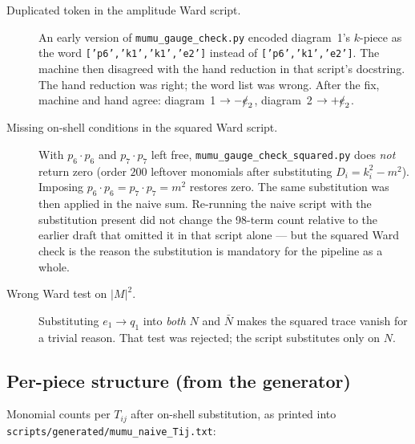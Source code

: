 \documentclass[11pt]{article}
\begin{document}
\begin{description}
  \item[Duplicated token in the amplitude Ward script.]
    An early version of \texttt{mumu\_gauge\_check.py} encoded diagram~1's
    $k$-piece as the word \texttt{['p6','k1','k1','e2']} instead of
    \texttt{['p6','k1','e2']}. The machine then disagreed with the hand
    reduction in that script's docstring. The hand reduction was right;
    the word list was wrong. After the fix, machine and hand agree:
    diagram~1 $\to-\slashed e_2$, diagram~2 $\to+\slashed e_2$.
  \item[Missing on-shell conditions in the squared Ward script.]
    With $p_6{\cdot}p_6$ and $p_7{\cdot}p_7$ left free,
    \texttt{mumu\_gauge\_check\_squared.py} does \emph{not} return zero
    (order $200$ leftover monomials after substituting $D_i=k_i^2-m^2$).
    Imposing $p_6{\cdot}p_6=p_7{\cdot}p_7=m^2$ restores zero. The same
    substitution was then applied in the naive sum. Re-running the naive
    script with the substitution present did not change the 98-term count
    relative to the earlier draft that omitted it in that script alone
    --- but the squared Ward check is the reason the substitution is
    mandatory for the pipeline as a whole.
  \item[Wrong Ward test on $|M|^2$.]
    Substituting $e_1\to q_1$ into \emph{both} $N$ and $\bar N$ makes the
    squared trace vanish for a trivial reason. That test was rejected; the
    script substitutes only on $N$.
\end{description}

\subsection{Per-piece structure (from the generator)}
\label{app:counts}

Monomial counts per $T_{ij}$ after on-shell substitution, as printed into
\texttt{scripts/generated/mumu\_naive\_Tij.txt}:
\end{document}

